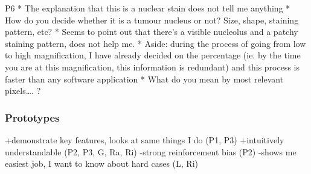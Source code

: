 P6
* The explanation that this is a nuclear stain does not tell me anything
* How do you decide whether it is a tumour nucleus or not? Size, shape, staining pattern, etc?
* Seems to point out that there’s a visible nucleolus and a patchy staining pattern, does not help me.
* Aside: during the process of going from low to high magnification, I have already decided on the percentage (ie. by the time you are at this magnification, this information is redundant) and this process is faster than any software application
* What do you mean by most relevant pixels…. ?




\subsubsection{Prototypes}
+demonstrate key features, looks at same things I do (P1, P3)
+intuitively understandable (P2, P3, G, Ra, Ri)
-strong reinforcement bias (P2)
-shows me easiest job, I want to know about hard cases (L, Ri)



